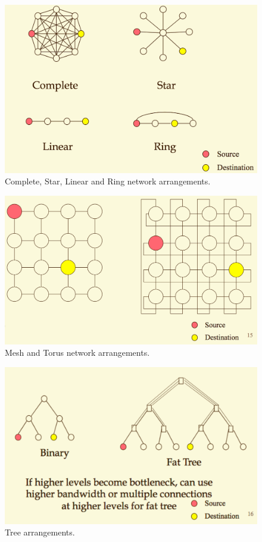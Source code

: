 \begin{figure}
\centering
\includegraphics[width=0.7\linewidth]{figures/screenshot123}
\caption{Complete, Star, Linear and Ring network arrangements.}
\label{fig:screenshot123}
\end{figure}

\begin{figure}
\centering
\includegraphics[width=0.7\linewidth]{figures/screenshot124}
\caption{Mesh and Torus network arrangements.}
\label{fig:screenshot124}
\end{figure}

\begin{figure}
\centering
\includegraphics[width=0.7\linewidth]{figures/screenshot125}
\caption{Tree arrangements.}
\label{fig:screenshot125}
\end{figure}

